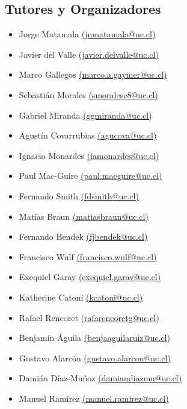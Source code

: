 \pagebreak
\subsection*{Tutores y Organizadores}
\begin{itemize}
	\item Jorge Matamala \href{mailto:jnmatamala@uc.cl}{(jnmatamala@uc.cl)}
	\item Javier del Valle  \href{mailto:javier.delvalle@uc.cl}{(javier.delvalle@uc.cl)}
	\item Marco Gallegos \href{mailto:marco.a.gaymer@uc.cl}{(marco.a.gaymer@uc.cl)}
	\item Sebastián Morales \href{mailto:smoralesc8@uc.cl}{(smoralesc8@uc.cl)}
	\item Gabriel Miranda \href{mailto:ggmiranda@uc.cl}{(ggmiranda@uc.cl)}
	\item Agustín Covarrubias \href{mailto:agucova@uc.cl}{(agucova@uc.cl)}
	\item Ignacio Monardes \href{mailto:iamonardes@uc.cl}{(iamonardes@uc.cl)}
	\item Paul Mac-Guire \href{mailto:paul.macguire@uc.cl}{(paul.macguire@uc.cl)}
	\item Fernando Smith \href{mailto:fdsmith@uc.cl}{(fdsmith@uc.cl)}
	\item Matías Braun \href{mailto:matiasbraun@uc.cl}{(matiasbraun@uc.cl)}
	\item Fernando Bendek \href{mailto:fjbendek@uc.cl}{(fjbendek@uc.cl)}
	\item Francisco Wulf \href{mailto:francisco.wulf@uc.cl}{(francisco.wulf@uc.cl)}
	\item Exequiel Garay \href{mailto:exequiel.garay@uc.cl}{(exequiel.garay@uc.cl)}
	\item Katherine Catoni \href{mailto:kcatoni@uc.cl}{(kcatoni@uc.cl)}
	\item Rafael Rencoret \href{mailto:rafarencoretg@uc.cl}{(rafarencoretg@uc.cl)}
	\item Benjamín Águila \href{mailto:benjaaguilaruiz@uc.cl}{(benjaaguilaruiz@uc.cl)}
	\item Gustavo Alarcón \href{mailto:gustavo.alarcon@uc.cl}{(gustavo.alarcon@uc.cl)}
	\item Damián Díaz-Muñoz \href{mailto:damiandiazmu@uc.cl}{(damiandiazmu@uc.cl)}
	\item Manuel Ramírez \href{mailto:manuel.ramirez@uc.cl}{(manuel.ramirez@uc.cl)}
\end{itemize}
